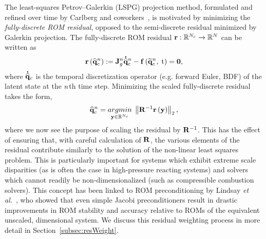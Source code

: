 The least-squares Petrov--Galerkin (LSPG) projection method, formulated and refined over time by Carlberg and coworkers~\cite{Carlberg2010,Carlberg2013,Carlberg2017}, is motivated by minimizing the \textit{fully-discrete ROM residual}, opposed to the semi-discrete residual minimized by Galerkin projection. The fully-discrete ROM residual $\mathbf{r}: \mathbb{R}^{N_c} \rightarrow \mathbb{R}^{N}$ can be written as
%
\begin{equation}
    \mathbf{r}\left(\mathbf{\widehat{q}}_{c}^{n}\right) := \mathbf{J}_{g}^{n} \accentset{\mbox{\large\bfseries .}}{\mathbf{\widehat{q}}}_{c}^{n} - \mathbf{f} \left(\mathbf{\widetilde{q}}_{c}^{n}, \; \text{t}\right) = \mathbf{0},
\end{equation}
%
where $\accentset{\mbox{\large\bfseries .}}{\mathbf{\widehat{q}}}_{c}$ is the temporal discretization operator (e.g. forward Euler, BDF) of the latent state at the $n$th time step. Minimizing the scaled fully-discrete residual takes the form,
%
\begin{equation}\label{eq:lspgLS}
    \consVecCoef^{\timeIdx} = \argmin{\dummyVec \inROne{\numConsModes}} \left\Vert \resScaleInv \resFunc{\dummyVec} \right\Vert_2,
\end{equation}
%
where we now see the purpose of scaling the residual by $\resScaleInv$. This has the effect of ensuring that, with careful calculation of $\resScale$, the various elements of the residual contribute similarly to the solution of the non-linear least squares problem. This is particularly important for systems which exhibit extreme scale disparities (as is often the case in high-pressure reacting systems) and solvers which cannot readily be non-dimensionalized (such as compressible combustion solvers). This concept has been linked to ROM preconditioning by Lindsay \textit{et al.}~\cite{Lindsay2022}, who showed that even simple Jacobi preconditioners result in drastic improvements in ROM stability and accuracy relative to ROMs of the equivalent unscaled, dimensional system. We discuss this residual weighting process in more detail in Section~\ref{subsec:resWeight}.

